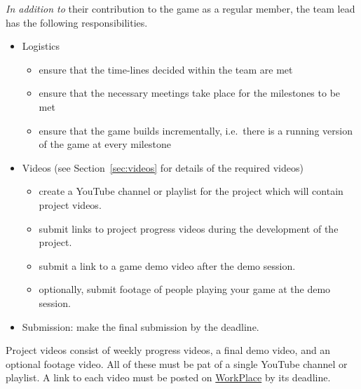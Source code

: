 \documentclass[addpoints]{exam}
\begin{document}
\begin{questions}
\textit{In addition to} their contribution to the game as a regular member, the team lead has the following responsibilities.
\begin{itemize}
\item Logistics
  \begin{itemize}
  \item ensure that the time-lines decided within the team are met
  \item ensure that the necessary meetings take place for the milestones to be met
  \end{itemize}
  \begin{itemize}
  \item ensure that the game builds incrementally, i.e.\ there is a running version of the game at every milestone
  \end{itemize}
\item Videos (see Section~\ref{sec:videos} for details of the required videos)
  \begin{itemize}
  \item create a YouTube channel or playlist for the project which will contain project videos.
  \item submit links to project progress videos during the development of the project.
  \item submit a link to a game demo video after the demo session.
  \item optionally, submit footage of people playing your game at the demo session.
  \end{itemize}
\item Submission: make the final submission by the deadline.
\end{itemize}

\label{sec:videos}

Project videos consist of weekly progress videos, a final demo video, and an optional footage video. All of these must be pat of a single YouTube channel or playlist. A link to each video must be posted on \href{https://habibedu.workplace.com/groups/454695375131714/permalink/510521982882386/}{WorkPlace} by its deadline.


\end{questions}
\end{document}
